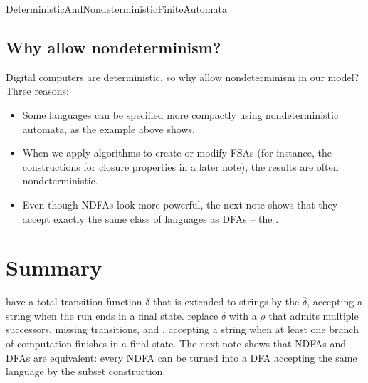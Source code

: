 \documentclass[hidelinks]{article}
\begin{document}
\begin{smodule}[title={Deterministic and Nondeterministic Finite State Automata}]{DeterministicAndNondeterministicFiniteAutomata}
\subsection{Why allow nondeterminism?}

Digital computers are deterministic, so why allow nondeterminism in our model? Three reasons:
\begin{itemize}
  \item Some languages can be specified more compactly using nondeterministic automata, as the example above shows.
  \item When we apply algorithms to create or modify FSAs (for instance, the constructions for closure properties in a later note), the results are often nondeterministic.
  \item Even though NDFAs look more powerful, the next note shows that they accept exactly the same class of languages as DFAs -- the .
\end{itemize}

\section{Summary}

 have a total transition function $\delta$ that is extended to strings by the  $\overline{\delta}$, accepting a string when the run ends in a final state.  replace $\delta$ with a  $\rho$ that admits multiple successors, missing transitions, and , accepting a string when at least one branch of computation finishes in a final state. The next note shows that NDFAs and DFAs are equivalent: every NDFA can be turned into a DFA accepting the same language by the subset construction.

\end{smodule}
\end{document}
